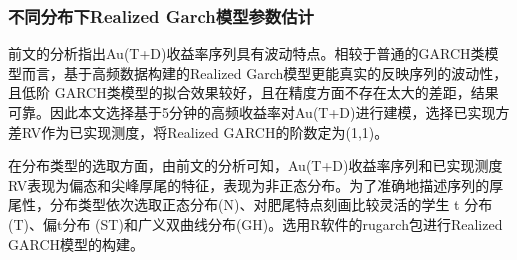 \documentclass[UTF8,a4paper,12pt]{ctexart}  %
\begin{document}
\hypertarget{realized-garch-5}{%
\subsubsection{不同分布下Realized Garch模型参数估计}\label{realized-garch-5}}

前文的分析指出Au(T+D)收益率序列具有波动特点。相较于普通的GARCH类模型而言，基于高频数据构建的Realized Garch模型更能真实的反映序列的波动性，且低阶 GARCH类模型的拟合效果较好，且在精度方面不存在太大的差距，结果可靠。因此本文选择基于5分钟的高频收益率对Au(T+D)进行建模，选择已实现方差RV作为已实现测度，将Realized GARCH的阶数定为(1,1)。

在分布类型的选取方面，由前文的分析可知，Au(T+D)收益率序列和已实现测度RV表现为偏态和尖峰厚尾的特征，表现为非正态分布。为了准确地描述序列的厚尾性，分布类型依次选取正态分布(N)、对肥尾特点刻画比较灵活的学生 t 分布(T)、偏t分布
(ST)和广义双曲线分布(GH)。选用R软件的rugarch包进行Realized GARCH模型的构建。
\end{document}
